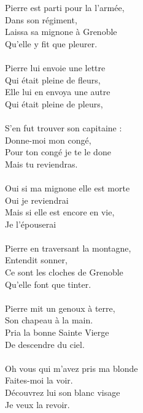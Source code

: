 
 Pierre est parti pour la l'armée,
\\Dans son régiment,
\\Laissa sa mignone à Grenoble
\\Qu'elle y fit que pleurer. \bissimple
\\\\Pierre lui envoie une lettre
\\Qui était pleine de fleurs,
\\Elle lui en envoya une autre
\\Qui était pleine de pleurs,  \bissimple
\\\\S'en fut trouver son capitaine :
\\Donne-moi mon congé,
\\Pour ton congé je te le done
\\Mais tu reviendras.  \bissimple
\\\\Oui si ma mignone elle est morte
\\Oui je reviendrai
\\Mais si elle est encore en vie,
\\Je l'épouserai  \bissimple
\\\\Pierre en traversant la montagne,
\\Entendit sonner,
\\Ce sont les cloches de Grenoble
\\Qu'elle font que tinter.  \bissimple
\\\\Pierre mit un genoux à terre,
\\Son chapeau à la main.
\\Pria la bonne Sainte Vierge
\\De descendre du ciel.  \bissimple
\\\\Oh vous qui m'avez pris ma blonde
\\Faites-moi la voir.
\\Découvrez lui son blanc visage
\\Je veux la revoir.  \bissimple
